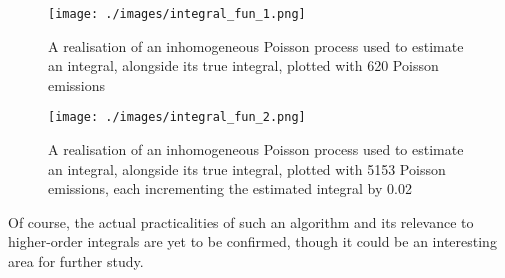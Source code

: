 \begin{figure}
\centering
\texttt{[image: ./images/integral\_fun\_1.png]}
\caption{A realisation of an inhomogeneous Poisson process used to estimate an integral, alongside its true integral, plotted with 620 Poisson emissions}
\label{integral_fun_1}
\end{figure}

\begin{figure}
\centering
\texttt{[image: ./images/integral\_fun\_2.png]}
\caption{A realisation of an inhomogeneous Poisson process used to estimate an integral, alongside its true integral, plotted with 5153 Poisson emissions, each incrementing the estimated integral by 0.02}
\label{integral_fun_2}
\end{figure}

Of course, the actual practicalities of such an algorithm and its relevance to higher-order integrals are yet to be confirmed, though it could be an interesting area for further study.